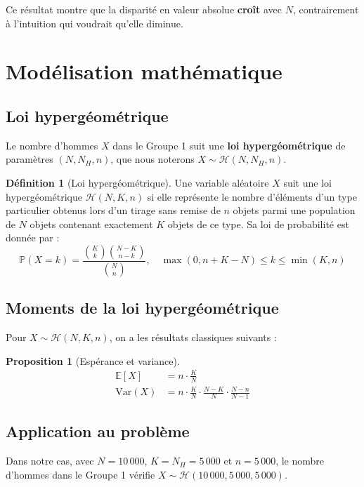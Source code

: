\documentclass[11pt,a4paper]{article}
\newtheorem{proposition}{Proposition}
\theoremstyle{definition}
\newtheorem{definition}{Définition}
\theoremstyle{remark}
\begin{document}
Ce résultat montre que la disparité en valeur absolue \textbf{croît} avec $N$, contrairement à l'intuition qui voudrait qu'elle diminue.

\section{Modélisation mathématique}

\subsection{Loi hypergéométrique}

Le nombre d'hommes $X$ dans le Groupe 1 suit une \textbf{loi hypergéométrique} de paramètres $(N, N_H, n)$, que nous noterons $X \sim \mathcal{H}(N, N_H, n)$.

\begin{definition}[Loi hypergéométrique]
Une variable aléatoire $X$ suit une loi hypergéométrique $\mathcal{H}(N, K, n)$ si elle représente le nombre d'éléments d'un type particulier obtenus lors d'un tirage sans remise de $n$ objets parmi une population de $N$ objets contenant exactement $K$ objets de ce type. Sa loi de probabilité est donnée par :
\[
\mathbb{P}(X = k) = \frac{\binom{K}{k}\binom{N-K}{n-k}}{\binom{N}{n}}, \quad \max(0, n+K-N) \leq k \leq \min(K, n)
\]
\end{definition}

\subsection{Moments de la loi hypergéométrique}

Pour $X \sim \mathcal{H}(N, K, n)$, on a les résultats classiques suivants :

\begin{proposition}[Espérance et variance]
\begin{align}
\mathbb{E}[X] &= n \cdot \frac{K}{N} \label{eq:esperance}\\
\text{Var}(X) &= n \cdot \frac{K}{N} \cdot \frac{N-K}{N} \cdot \frac{N-n}{N-1} \label{eq:variance}
\end{align}
\end{proposition}

\subsection{Application au problème}

Dans notre cas, avec $N = 10\,000$, $K = N_H = 5\,000$ et $n = 5\,000$, le nombre d'hommes dans le Groupe 1 vérifie $X \sim \mathcal{H}(10\,000, 5\,000, 5\,000)$.
\end{document}
